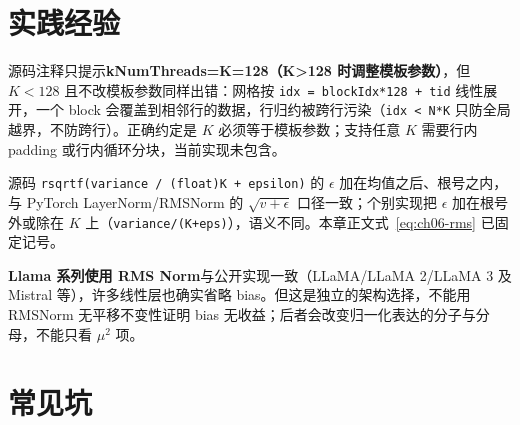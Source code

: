 \section{实践经验}

\begin{kaogu}
源码注释只提示\textbf{kNumThreads=K=128（K>128 时调整模板参数）}，但 $K < 128$ 且不改模板参数同样出错：网格按 \texttt{idx =\allowbreak{} block\allowbreak{}Idx*128 + tid} 线性展开，一个 block 会覆盖到相邻行的数据，行归约被跨行污染（\texttt{idx < N*K} 只防全局越界，不防跨行）。正确约定是 $K$ 必须等于模板参数；支持任意 $K$ 需要行内 padding 或行内循环分块，当前实现未包含。
\end{kaogu}

\begin{kaogu}
源码 \texttt{rsqrtf\allowbreak{}(variance /\allowbreak{} (float)K + epsilon)} 的 $\epsilon$ 加在均值之后、根号之内，与 PyTorch LayerNorm/RMSNorm 的 $\sqrt{v + \epsilon}$ 口径一致；个别实现把 $\epsilon$ 加在根号外或除在 $K$ 上（\texttt{variance/\allowbreak{}(K+eps)}），语义不同。本章正文式~\eqref{eq:ch06-rms} 已固定记号。
\end{kaogu}

\begin{kaogu}
\textbf{Llama 系列使用 RMS Norm}与公开实现一致（LLaMA/LLaMA 2/LLaMA 3 及 Mistral 等），许多线性层也确实省略 bias。但这是独立的架构选择，不能用 RMSNorm 无平移不变性证明 bias 无收益；后者会改变归一化表达的分子与分母，不能只看 $\mu^2$ 项。
\end{kaogu}

\section{常见坑}


